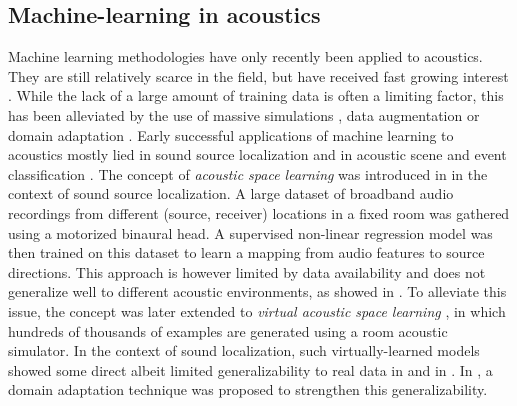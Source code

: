 \documentclass[reprint]{JASA}
\makeatletter
\newif\ifnotes
\newcommand{\note}[1]{\@bsphack\ifnotes{#1}\fi\@esphack}
\makeatother
\begin{document}
\subsection{\label{subsec:related_ml}Machine-learning in acoustics}
Machine learning methodologies have only recently been applied to acoustics. They are still relatively scarce in the field, but have received fast growing interest \cite{bianco2019machine}. While the lack of a large amount of training data is often a limiting factor, this has been alleviated by the use of massive simulations \cite{gaultier2017vast,kim2017generation}, data augmentation \cite{gamper2018blind} or domain adaptation \cite{he2019adaptation}.
Early successful applications of machine learning to acoustics mostly lied in sound source localization \cite{deleforge2014acoustic,deleforge2015co,gaultier2017vast,chakrabarty2017broadband,he2019adaptation,di2019mirage, niu2017source, lefort2017direct} and in acoustic scene and event classification \cite{parsons2000acoustic, deecke2006automated, gradivsek2017predicting,mesaros2017dcase, mesaros2019acoustic}.
\note{\sout{Application domains include robot audition \mbox{\cite{deleforge2014acoustic,he2019adaptation}}, bioacoustics \mbox{\cite{parsons2000acoustic, deecke2006automated, gradivsek2017predicting}} and underwater acoustics \mbox{\cite{niu2017source,lefort2017direct}}.}}
The concept of \textit{acoustic space learning} was introduced in \cite{deleforge2014acoustic} in the context of sound source localization. A large dataset of broadband audio recordings from different (source, receiver) locations in a fixed room was gathered using a motorized binaural head. A supervised non-linear regression model was then trained on this dataset to learn a mapping from audio features to source directions. This approach is however limited by data availability and does not generalize well to different acoustic environments, as showed in \cite{deleforge2015co}. To alleviate this issue, the concept was later extended to \textit{virtual acoustic space learning} \cite{gaultier2017vast,kataria2017hearing}, in which hundreds of thousands of examples are generated using a room acoustic simulator. In the context of sound localization, such virtually-learned models showed some direct albeit limited generalizability to real data in \cite{gaultier2017vast} and in \cite{chakrabarty2017broadband}. In \cite{he2019adaptation}, a domain adaptation technique was proposed to strengthen this generalizability. 
\end{document}
